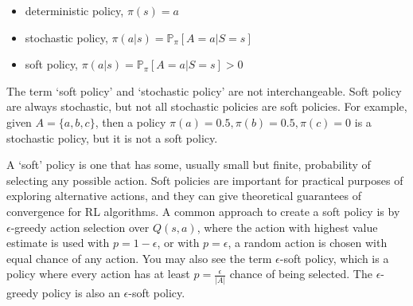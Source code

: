 \documentclass[lang=en,mode=normal,device=normal,color=blue,12pt]{elegantnote}
\DeclareMathOperator*{\1}{\mathbbm{1}}
\begin{document}
\begin{appendices}
\begin{itemize}
\item deterministic policy, $\pi(s) = a$
\item stochastic policy, $\pi(a|s) = \mathbb{P}_\pi [A=a | S=s]$
\item soft policy, $\pi(a|s) = \mathbb{P}_\pi [A=a | S=s] > 0$
\end{itemize}

The term `soft policy' and `stochastic policy' are not interchangeable. Soft policy are always stochastic, but not all stochastic policies are soft policies. For example, given $A = \{a,b,c\}$, then a policy $\pi(a) = 0.5, \pi(b)=0.5, \pi(c)=0$ is a stochastic policy, but it is not a soft policy.

A `soft' policy is one that has some, usually small but finite, probability of selecting any possible action. Soft policies are important for practical purposes of exploring alternative actions, and they can give theoretical guarantees of convergence for RL algorithms.
A common approach to create a soft policy is by $\epsilon$-greedy action selection over $Q(s,a)$, where the action with highest value estimate is used with $p = 1 - \epsilon$, or with $p = \epsilon$, a random action is chosen with equal chance of any action.
You may also see the term $\epsilon$-soft policy, which is a policy where every action has at least $p = \frac{\epsilon}{|A|}$ chance of being selected.
The $\epsilon$-greedy policy is also an $\epsilon$-soft policy.




\end{appendices}



\newpage

\end{document}
